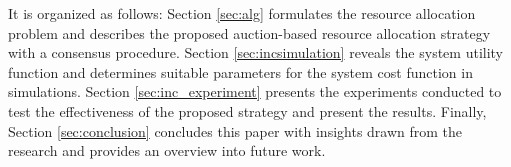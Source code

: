 \documentclass[journal]{IEEEtran}  %
\begin{document}
It is organized as follows: 
Section \ref{sec:alg} formulates the resource allocation problem and describes
the proposed auction-based resource allocation strategy with a consensus
procedure. 
Section \ref{sec:incsimulation} reveals the system utility function and
determines suitable parameters for the system cost function in simulations. 
Section \ref{sec:inc_experiment} presents the experiments conducted to test
the effectiveness of the proposed strategy and present the results. 
Finally, Section \ref{sec:conclusion} concludes this paper with insights drawn
from the research and provides an overview into future work.



%
%
%
%
\end{document}

